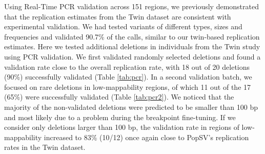 Using Real-Time PCR validation across 151 regions, we previously demonstrated that the replication estimates from the Twin dataset are consistent with experimental validation\cite{Monlong2018}.
We had tested variants of different types, sizes and frequencies and validated 90.7\% of the calls, similar to our twin-based replication estimates.
Here we tested additional deletions in individuals from the Twin study using PCR validation.
We first validated randomly selected deletions and found a validation rate close to the overall replication rate, with 18 out of 20 deletions (90\%) successfully validated (Table \ref{tab:pcr}).
In a second validation batch, we focused on rare deletions in low-mappability regions, of which 11 out of the 17 (65\%) were successfully validated (Table \ref{tab:pcr2}).
We noticed that the majority of the non-validated deletions were predicted to be smaller than 100 bp and most likely due to a problem during the breakpoint fine-tuning.
If we consider only deletions larger than 100 bp, the validation rate in regions of low-mappability increased to 83\% (10/12) once again close to {\sf PopSV}'s replication rates in the Twin dataset.

